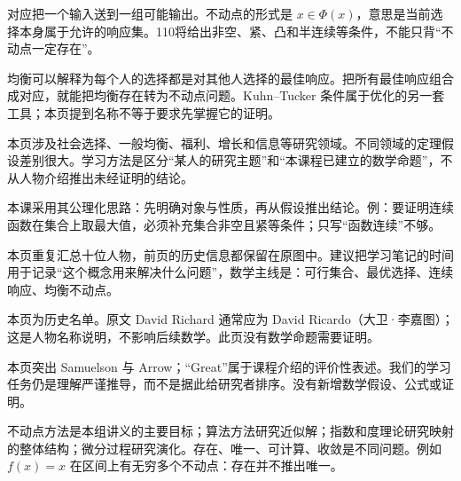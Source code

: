 对应把一个输入送到一组可能输出。不动点的形式是 $x\in\Phi(x)$，意思是当前选择本身属于允许的响应集。110将给出非空、紧、凸和半连续等条件，不能只背“不动点一定存在”。

均衡可以解释为每个人的选择都是对其他人选择的最佳响应。把所有最佳响应组合成对应，就能把均衡存在转为不动点问题。Kuhn--Tucker 条件属于优化的另一套工具；本页提到名称不等于要求先掌握它的证明。

本页涉及社会选择、一般均衡、福利、增长和信息等研究领域。不同领域的定理假设差别很大。学习方法是区分“某人的研究主题”和“本课程已建立的数学命题”，不从人物介绍推出未经证明的结论。

本课采用其公理化思路：先明确对象与性质，再从假设推出结论。例：要证明连续函数在集合上取最大值，必须补充集合非空且紧等条件；只写“函数连续”不够。

本页重复汇总十位人物，前页的历史信息都保留在原图中。建议把学习笔记的时间用于记录“这个概念用来解决什么问题”，数学主线是：可行集合、最优选择、连续响应、均衡不动点。

本页为历史名单。原文 David Richard 通常应为 David Ricardo（大卫·李嘉图）；这是人物名称说明，不影响后续数学。此页没有数学命题需要证明。

本页突出 Samuelson 与 Arrow；“Great”属于课程介绍的评价性表述。我们的学习任务仍是理解严谨推导，而不是据此给研究者排序。没有新增数学假设、公式或证明。

不动点方法是本组讲义的主要目标；算法方法研究近似解；指数和度理论研究映射的整体结构；微分过程研究演化。存在、唯一、可计算、收敛是不同问题。例如 $f(x)=x$ 在区间上有无穷多个不动点：存在并不推出唯一。

